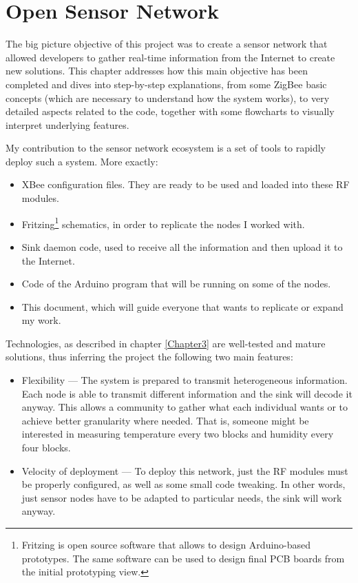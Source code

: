 \chapter{Open Sensor Network}
\label{Chapter5}



The big picture objective of this project was to create a sensor network that allowed developers to gather real-time information from the Internet to create new solutions\citep{barcelobottom}. This chapter addresses how this main objective has been completed and dives into step-by-step explanations, from some ZigBee basic concepts (which are necessary to understand how the system works), to very detailed aspects related to the code, together with some flowcharts to visually interpret underlying features.

My contribution to the sensor network ecosystem is a set of tools to rapidly deploy such a system. More exactly:

\begin{itemize}
    \item XBee\textregistered{} configuration files. They are ready to be used and loaded into these RF modules.
    \item Fritzing\footnote{Fritzing is open source software that allows to design Arduino-based prototypes. The same software can be used to design final PCB boards from the initial prototyping view.} schematics, in order to replicate the nodes I worked with.
    \item Sink daemon code, used to receive all the information and then upload it to the Internet.
    \item Code of the Arduino program that will be running on some of the nodes.
    \item This document, which will guide everyone that wants to replicate or expand my work.
\end{itemize}

Technologies, as described in chapter \ref{Chapter3} are well-tested and mature solutions, thus inferring the project the following two main features:

\begin{itemize}
    \item Flexibility --- The system is prepared to transmit heterogeneous information. Each node is able to transmit different information and the sink will decode it anyway. This allows a community to gather what each individual wants or to achieve better granularity where needed. That is, someone might be interested in measuring temperature every two blocks and humidity every four blocks.
    \item Velocity of deployment --- To deploy this network, just the RF modules must be properly configured, as well as some small code tweaking. In other words, just sensor nodes have to be adapted to particular needs, the sink will work anyway.
\end{itemize}


